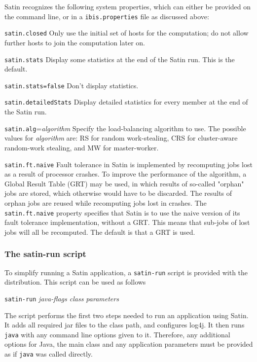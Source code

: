 \documentclass[a4paper,10pt]{article}
\begin{document}
Satin recognizes the following system properties, which can either
be provided on the command line, or in a \texttt{ibis.properties} file
as discussed above:
\begin{description}
\item{\texttt{satin.closed}}
Only use the initial set of hosts for the computation; do not allow
further hosts to join the computation later on.
\item{\texttt{satin.stats}}
Display some statistics at the end of the Satin run. This is the default.
\item{\texttt{satin.stats=false}}
Don't display statistics.
\item{\texttt{satin.detailedStats}}
Display detailed statistics for every member at the end of the Satin run.
\item{\texttt{satin.alg}=\emph{algorithm}}
Specify the load-balancing algorithm to use. The possible values for
\emph{algorithm} are: RS for random work-stealing, CRS for cluster-aware
random-work stealing, and MW for master-worker.
\item{\texttt{satin.ft.naive}}
Fault tolerance in Satin is implemented by recomputing jobs lost as a
result of processor crashes.
To improve the performance of the
algorithm, a Global Result Table (GRT) may be used, in which results of
so-called "orphan" jobs are stored, which otherwise would have to be discarded.
The results of orphan jobs are reused while recomputing jobs lost in
crashes. The \texttt{satin.ft.naive} property specifies that Satin is
to use the naive version of its fault tolerance implementation, without
a GRT. This means that sub-jobs of lost jobs will all be recomputed.
The default is that a GRT is used.
\end{description}

\subsubsection{The satin-run script}

To simplify running a Satin application, a \texttt{satin-run} script is
provided with the distribution. This script can be
used as follows

\begin{center}
\texttt{satin-run} \emph{java-flags class parameters}
\end{center}

The script performs the first two steps needed to run an application
using Satin. It adds all required jar files
to the class path, and configures log4j.
It then runs \texttt{java} with any
command line options given to it. Therefore, any additional options for
Java, the main class and any application parameters must be provided as
if \texttt{java} was called directly.
\end{document}
